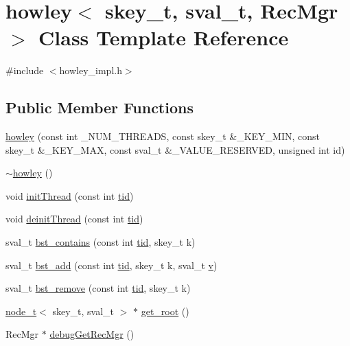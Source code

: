 \hypertarget{classhowley}{}\section{howley$<$ skey\+\_\+t, sval\+\_\+t, Rec\+Mgr $>$ Class Template Reference}
\label{classhowley}


{\ttfamily \#include $<$howley\+\_\+impl.\+h$>$}

\subsection*{Public Member Functions}
\begin{DoxyCompactItemize}
\item 
\hyperlink{classhowley_ac5d2f61eedc19a5b2f5db14421682b4c}{howley} (const int \+\_\+\+N\+U\+M\+\_\+\+T\+H\+R\+E\+A\+DS, const skey\+\_\+t \&\+\_\+\+K\+E\+Y\+\_\+\+M\+IN, const skey\+\_\+t \&\+\_\+\+K\+E\+Y\+\_\+\+M\+AX, const sval\+\_\+t \&\+\_\+\+V\+A\+L\+U\+E\+\_\+\+R\+E\+S\+E\+R\+V\+ED, unsigned int id)
\item 
\hyperlink{classhowley_a7683fe814e9483ec72e02b552965d9a8}{$\sim$howley} ()
\item 
void \hyperlink{classhowley_ad896657fb61ab833beb5854d3ab41195}{init\+Thread} (const int \hyperlink{microbench_2main_8cpp_a9ca9869868fe7e7a38a921cc7de4103f}{tid})
\item 
void \hyperlink{classhowley_ad451346bdc013f8f91a66e864ff6118c}{deinit\+Thread} (const int \hyperlink{microbench_2main_8cpp_a9ca9869868fe7e7a38a921cc7de4103f}{tid})
\item 
sval\+\_\+t \hyperlink{classhowley_a42cff4d570c8fda67543525ebc0342e3}{bst\+\_\+contains} (const int \hyperlink{microbench_2main_8cpp_a9ca9869868fe7e7a38a921cc7de4103f}{tid}, skey\+\_\+t k)
\item 
sval\+\_\+t \hyperlink{classhowley_a2c3298e68329401c0ba27bf50a11f624}{bst\+\_\+add} (const int \hyperlink{microbench_2main_8cpp_a9ca9869868fe7e7a38a921cc7de4103f}{tid}, skey\+\_\+t k, sval\+\_\+t \hyperlink{reclaimer__ebr__tree__q_8h_acd3c1c4d280aac729e9fdb520dc99f20}{v})
\item 
sval\+\_\+t \hyperlink{classhowley_a469bbd88967ff50d865bbf368b1eae5e}{bst\+\_\+remove} (const int \hyperlink{microbench_2main_8cpp_a9ca9869868fe7e7a38a921cc7de4103f}{tid}, skey\+\_\+t k)
\item 
\hyperlink{structnode__t}{node\+\_\+t}$<$ skey\+\_\+t, sval\+\_\+t $>$ $\ast$ \hyperlink{classhowley_a37175ef84b9e6c359dc5cc1148fa289b}{get\+\_\+root} ()
\item 
Rec\+Mgr $\ast$ \hyperlink{classhowley_a9581b4d5eb22feca0cd2ac799a0c6145}{debug\+Get\+Rec\+Mgr} ()
\end{DoxyCompactItemize}


